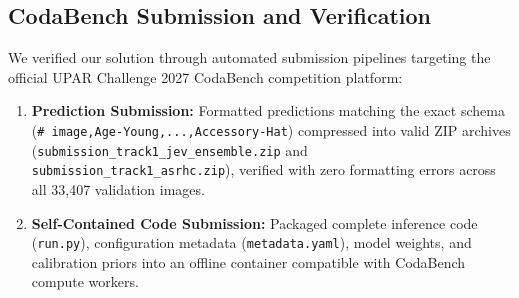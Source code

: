 \subsection{CodaBench Submission and Verification}
We verified our solution through automated submission pipelines targeting the official UPAR Challenge 2027 CodaBench competition platform:
\begin{enumerate}
    \item \textbf{Prediction Submission:} Formatted predictions matching the exact schema (\verb|# image,Age-Young,...,Accessory-Hat|) compressed into valid ZIP archives (\verb|submission_track1_jev_ensemble.zip| and \verb|submission_track1_asrhc.zip|), verified with zero formatting errors across all 33,407 validation images.
    \item \textbf{Self-Contained Code Submission:} Packaged complete inference code (\verb|run.py|), configuration metadata (\verb|metadata.yaml|), model weights, and calibration priors into an offline container compatible with CodaBench compute workers.
\end{enumerate}

